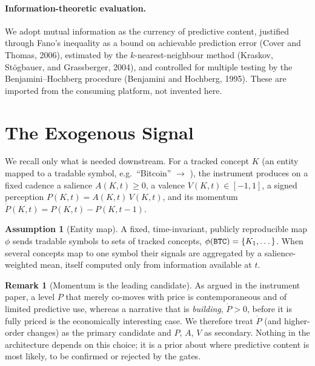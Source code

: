 \documentclass[11pt,a4paper]{article}
\theoremstyle{definition}
\newtheorem{remark}{Remark}[section]
\newtheorem{assumption}{Assumption}[section]
\theoremstyle{plain}
\newcommand{\code}[1]{\texttt{\detokenize{#1}}}
\begin{document}
\paragraph{Information-theoretic evaluation.}
We adopt mutual information as the currency of predictive content, justified through Fano's inequality
as a bound on achievable prediction error (Cover and Thomas, 2006), estimated by the
$k$-nearest-neighbour method (Kraskov, St\"ogbauer, and Grassberger, 2004), and controlled for
multiple testing by the Benjamini--Hochberg procedure (Benjamini and Hochberg, 1995). These are
imported from the consuming platform, not invented here.

\section{The Exogenous Signal}
\label{sec:signal}

We recall only what is needed downstream. For a tracked concept $K$ (an entity mapped to a tradable
symbol, e.g.\ ``Bitcoin'' $\to$ \code{BTC}), the instrument produces on a fixed cadence a salience
$A(K,t)\ge 0$, a valence $V(K,t)\in[-1,1]$, a signed perception $P(K,t)=A(K,t)\,V(K,t)$, and its
momentum $\dot P(K,t)=P(K,t)-P(K,t-1)$.

\begin{assumption}[Entity map]
\label{ass:map}
A fixed, time-invariant, publicly reproducible map $\phi$ sends tradable symbols to sets of tracked
concepts, $\phi(\code{BTC})=\{K_1,\dots\}$. When several concepts map to one symbol their signals are
aggregated by a salience-weighted mean, itself computed only from information available at $t$.
\end{assumption}

\begin{remark}[Momentum is the leading candidate]
\label{rem:momentum}
As argued in the instrument paper, a level $P$ that merely co-moves with price is contemporaneous and
of limited predictive use, whereas a narrative that is \emph{building}, $\dot P>0$, before it is fully
priced is the economically interesting case. We therefore treat $\dot P$ (and higher-order changes) as
the primary candidate and $P$, $A$, $V$ as secondary. Nothing in the architecture depends on this
choice; it is a prior about where predictive content is most likely, to be confirmed or rejected by
the gates.
\end{remark}
\end{document}
